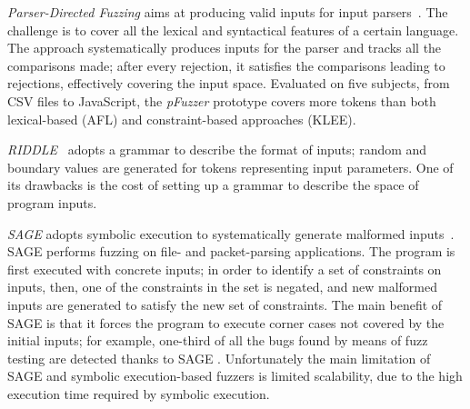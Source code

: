 \emph{Parser-Directed Fuzzing} aims at producing valid inputs for input parsers~\cite{mathis2019parser}. The challenge is to cover all the lexical and syntactical features of a certain language. The approach systematically produces inputs for the parser and tracks all the comparisons made; after every rejection, it satisfies the comparisons leading to rejections, effectively covering the input space. 
Evaluated on five subjects, from CSV files to JavaScript, the \emph{pFuzzer} prototype covers more tokens than both lexical-based (AFL) and constraint-based approaches (KLEE).

\emph{RIDDLE}~\cite{ghosh1998testing} adopts a grammar to describe the format of inputs; random and boundary values are generated for tokens representing input parameters.
One of its drawbacks is the cost of setting up a grammar to describe the space of program inputs.

\emph{SAGE} adopts symbolic execution to systematically generate malformed inputs~\cite{godefroid2012sage}. SAGE performs fuzzing on file- and packet-parsing applications. 
The program is first executed with concrete inputs; in order to identify a set of constraints on inputs, then, one of the constraints in the set is negated, and new malformed inputs are generated to satisfy the new set of constraints. 
The main benefit of SAGE is that it forces the program to execute corner cases not covered by the initial inputs; for example, 
one-third of all the bugs found by means of fuzz testing are detected thanks to SAGE \cite{bounimova2013billions}.
Unfortunately the main limitation of SAGE and symbolic execution-based fuzzers is limited scalability, due to the high execution time required by symbolic execution.


